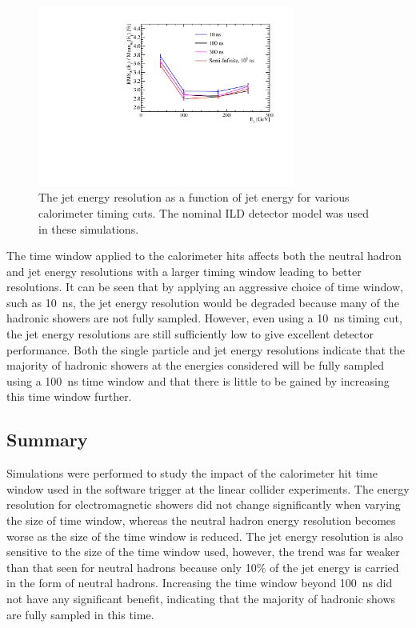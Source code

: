 \begin{figure}[h!]
\includegraphics[width=0.75\textwidth]{EnergyEstimators/Plots/TimingCuts/JER_vs_JetEnergy_TimingCutStudies.pdf}
\caption[The jet energy resolution as a function of jet energy for various calorimeter timing cuts.  The nominal ILD detector model was used in these simulations.]{The jet energy resolution as a function of jet energy for various calorimeter timing cuts.  The nominal ILD detector model was used in these simulations.}
\label{fig:jertimingcuts}
\end{figure}

The time window applied to the calorimeter hits affects both the neutral hadron and jet energy resolutions with a larger timing window leading to better resolutions.  It can be seen that by applying an aggressive choice of time window, such as 10~ns, the jet energy resolution would be degraded because many of the hadronic showers are not fully sampled.  However, even using a 10~ns timing cut, the jet energy resolutions are still sufficiently low to give excellent detector performance.  Both the single particle and jet energy resolutions indicate that the majority of hadronic showers at the energies considered will be fully sampled using a 100~ns time window and that there is little to be gained by increasing this time window further.


\subsection{Summary}
Simulations were performed to study the impact of the calorimeter hit time window used in the software trigger at the linear collider experiments.  The energy resolution for electromagnetic showers did not change significantly when varying the size of time window, whereas the neutral hadron energy resolution becomes worse as the size of the time window is reduced.  The jet energy resolution is also sensitive to the size of the time window used, however, the trend was far weaker than that seen for neutral hadrons because only 10\% of the jet energy is carried in the form of neutral hadrons.  Increasing the time window beyond 100~ns did not have any significant benefit, indicating that the majority of hadronic shows are fully sampled in this time.   

